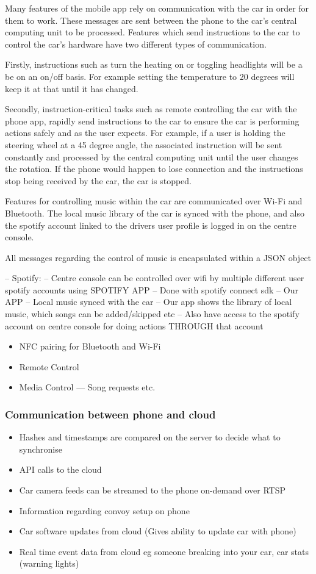 \documentclass{article}
\begin{document}
Many features of the mobile app rely on communication with the car in order for them to work. These messages are sent between the phone to the car's central computing unit to be processed. Features which send instructions to the car to control the car's hardware have two different types of communication. 

Firstly, instructions such as turn the heating on or toggling headlights will be a be on an on/off basis. For example setting the temperature to 20 degrees will keep it at that until it has changed.

Secondly, instruction-critical tasks such as remote controlling the car with the phone app, rapidly send instructions to the car to ensure the car is performing actions safely and as the user expects. For example, if a user is holding the steering wheel at a 45 degree angle, the associated instruction will be sent constantly and processed by the central computing unit until the user changes the rotation. If the phone would happen to lose connection and the instructions stop being received by the car, the car is stopped.

Features for controlling music within the car are communicated over Wi-Fi and Bluetooth. The local music library of the car is synced with the phone, and also the spotify account linked to the drivers user profile is logged in on the centre console.

All messages regarding the control of music is encapsulated within a JSON object 

-- Spotify: 
	-- Centre console can be controlled over wifi by multiple different user spotify accounts using SPOTIFY APP
    -- Done with spotify connect sdk
-- Our APP
	-- Local music synced with the car
		-- Our app shows the library of local music, which songs can be added/skipped etc
        -- Also have access to the spotify account on centre console for doing actions THROUGH that account

\begin{itemize}
  \item NFC pairing for Bluetooth and Wi-Fi
  \item Remote Control
  \item Media Control --- Song requests etc.
\end{itemize}
\subsubsection{Communication between phone and cloud}
\begin{itemize}
  \item Hashes and timestamps are compared on the server to decide what to synchronise
  \item API calls to the cloud
  \item Car camera feeds can be streamed to the phone on-demand over RTSP
  \item Information regarding convoy setup on phone
  \item Car software updates from cloud (Gives ability to update car with phone)
  \item Real time event data from cloud eg someone breaking into your car, car stats (warning lights)
\end{itemize}
\end{document}
